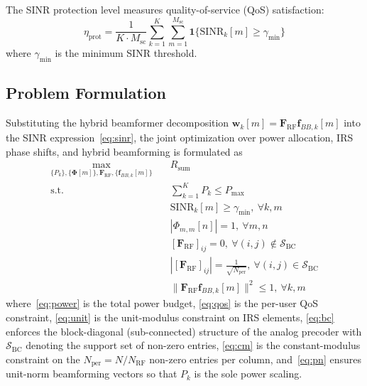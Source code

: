 \documentclass[journal,twocolumn]{IEEEtran}
\newcommand{\vect}[1]{\mathbf{#1}}
\newcommand{\mat}[1]{\mathbf{#1}}
\begin{document}
The SINR protection level measures quality-of-service (QoS) satisfaction:
\begin{equation}
\eta_{\text{prot}} = \frac{1}{K \cdot M_{\text{sc}}}\sum_{k=1}^{K}\sum_{m=1}^{M_{\text{sc}}} \mathbf{1}\{\text{SINR}_k[m] \geq \gamma_{\min}\}
\label{eq:protection}
\end{equation}
where $\gamma_{\min}$ is the minimum SINR threshold.

\subsection{Problem Formulation}

Substituting the hybrid beamformer decomposition $\vect{w}_k[m] = \mat{F}_{\text{RF}}\vect{f}_{BB,k}[m]$ into the SINR expression~\eqref{eq:sinr}, the joint optimization over power allocation, IRS phase shifts, and hybrid beamforming is formulated as
\begin{subequations}
\begin{align}
\max_{\{P_k\}, \{\bm{\Phi}[m]\}, \mat{F}_{\text{RF}}, \{\vect{f}_{BB,k}[m]\}} \quad & R_{\text{sum}} \label{eq:obj}\\
\text{s.t.} \quad & \sum_{k=1}^{K} P_k \leq P_{\max} \label{eq:power}\\
& \text{SINR}_k[m] \geq \gamma_{\min},\ \forall k, m \label{eq:qos}\\
& |\Phi_{m,m}[n]| = 1,\ \forall m, n \label{eq:unit}\\
& [\mat{F}_{\text{RF}}]_{ij} = 0,\ \forall (i,j) \notin \mathcal{S}_{\text{BC}} \label{eq:bc}\\
& |[\mat{F}_{\text{RF}}]_{ij}| = \tfrac{1}{\sqrt{N_{\text{per}}}},\ \forall (i,j) \in \mathcal{S}_{\text{BC}} \label{eq:cm}\\
& \|\mat{F}_{\text{RF}}\vect{f}_{BB,k}[m]\|^2 \leq 1,\ \forall k, m \label{eq:pn}
\end{align}
\end{subequations}
where~\eqref{eq:power} is the total power budget, \eqref{eq:qos} is the per-user QoS constraint, \eqref{eq:unit} is the unit-modulus constraint on IRS elements, \eqref{eq:bc} enforces the block-diagonal (sub-connected) structure of the analog precoder with $\mathcal{S}_{\text{BC}}$ denoting the support set of non-zero entries, \eqref{eq:cm} is the constant-modulus constraint on the $N_{\text{per}} = N/N_{\text{RF}}$ non-zero entries per column, and~\eqref{eq:pn} ensures unit-norm beamforming vectors so that $P_k$ is the sole power scaling.
\end{document}
